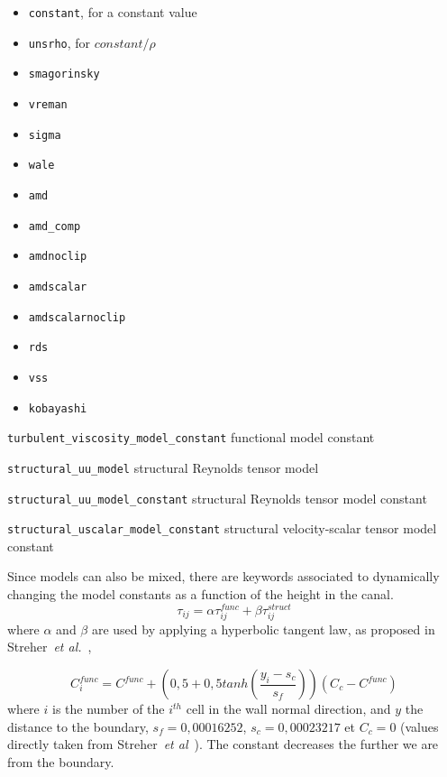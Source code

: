 \begin{itemize}
    \item \texttt{constant}, for a constant value
    \item \texttt{unsrho}, for $constant/\rho$
    \item \texttt{smagorinsky}
    \item \texttt{vreman}
    \item \texttt{sigma}
    \item \texttt{wale}
    \item \texttt{amd}
    \item \texttt{amd\_comp}
    \item \texttt{amdnoclip}
    \item \texttt{amdscalar}
    \item \texttt{amdscalarnoclip}
    \item \texttt{rds}
    \item \texttt{vss}
    \item \texttt{kobayashi}
\end{itemize}


\texttt{turbulent\_viscosity\_model\_constant} functional model constant

\texttt{structural\_uu\_model} structural Reynolds tensor model


\texttt{structural\_uu\_model\_constant} structural Reynolds tensor model constant

\texttt{structural\_uscalar\_model\_constant} structural velocity-scalar tensor model constant

Since models can also be mixed, there are keywords associated to dynamically changing the model constants as a function of the height in the canal.
\begin{equation}
\tau_{ij}=\alpha \tau_{ij}^{func} + \beta \tau_{ij}^{struct}
\label{eq_tau}
\end{equation}
where $\alpha$ and $\beta$ are used by applying a hyperbolic tangent law, as proposed in Streher~\textit{et al.}~\cite{streher_mixed_2021},

\begin{equation}
C_i^{func}=C^{func}+\left(0,5+0,5 tanh \left(\frac{y_i-s_c}{s_f}\right) \right) (C_c-C^{func})
\label{eq_Streher}
\end{equation}
where $i$ is the number of the $i^{th}$ cell in the wall normal direction, and $y$ the distance to the boundary, $s_f=0,00016252$, $s_c=0,00023217$ et $C_c=0$ (values directly taken from Streher~\textit{et al}~\cite{streher_mixed_2021}). The constant decreases the further we are from the boundary.

